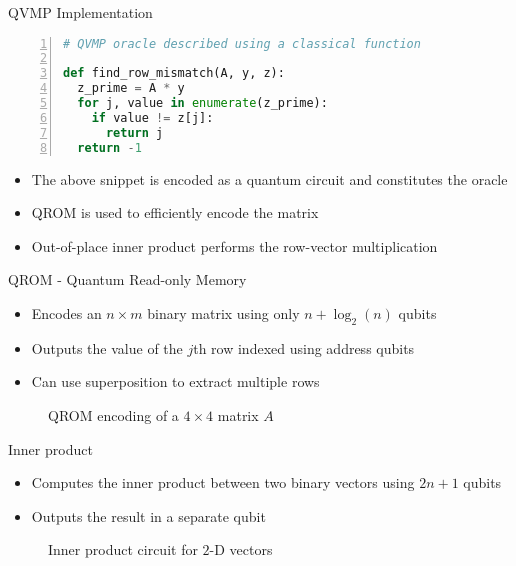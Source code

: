 \documentclass[10pt]{beamer}
\begin{document}
\begin{frame}[fragile]{QVMP Implementation}
  \begin{lstlisting}[frame=single,language=Python, numbers=left]
# QVMP oracle described using a classical function

def find_row_mismatch(A, y, z):
  z_prime = A * y
  for j, value in enumerate(z_prime):
    if value != z[j]:
      return j
  return -1
  \end{lstlisting}

  \begin{itemize}
    \item The above snippet is encoded as a quantum circuit and constitutes
      the oracle
    \item QROM is used to efficiently encode the matrix
    \item Out-of-place inner product performs the row-vector multiplication
  \end{itemize}
\end{frame}


\begin{frame}{QROM - Quantum Read-only Memory}
  \begin{itemize}
    \item Encodes an $n \times m$ binary matrix using only $n + \log_2(n)$ qubits
    \item Outputs the value of the $j$th row indexed using address qubits
    \item Can use superposition to extract multiple rows
  \end{itemize}
  \begin{figure}
      \centering
      
      \caption{QROM encoding of a $4 \times 4$ matrix $A$}
      \label{fig:qrom_4x4}
  \end{figure}
\end{frame}


\begin{frame}{Inner product}
  \begin{itemize}
    \item Computes the inner product between two binary vectors using $2n + 1$
      qubits
    \item Outputs the result in a separate qubit
  \end{itemize}
  \begin{figure}
    \centering
    
    \caption{Inner product circuit for $2$-D vectors}
    \label{fig:inner_product}
  \end{figure}
\end{frame}
\end{document}
